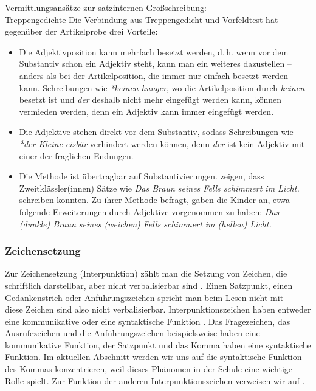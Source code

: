 \begin{Exkurs}{Vermittlungsansätze zur satzinternen Großschreibung:\\ Treppengedichte}
Die Verbindung aus Treppengedicht und Vorfeldtest hat gegenüber der Artikelprobe drei Vorteile:

\begin{itemize}
    \item Die Adjektivposition kann mehrfach besetzt werden, d.\,h.  wenn vor dem Substantiv schon ein Adjektiv steht, kann man ein weiteres dazustellen -- anders als bei der Artikelposition, die immer nur einfach besetzt werden kann. Schreibungen wie \textit{*keinen hunger}, wo die Artikelposition durch \textit{keinen} besetzt ist und \textit{der} deshalb nicht mehr eingefügt werden kann, können vermieden werden, denn ein Adjektiv kann immer eingefügt werden.
    \item Die Adjektive stehen direkt vor dem Substantiv, sodass Schreibungen wie \textit{*der Kleine eisbär} verhindert werden können, denn \textit{der} ist kein Adjektiv mit einer der fraglichen Endungen.
    \item Die Methode ist übertragbar auf Substantivierungen. \citet[19--20]{GuentherNuenke2005} zeigen, dass Zweitklässler(innen) Sätze wie \textit{Das Braun seines Fells schimmert im Licht.} schreiben konnten. Zu ihrer Methode befragt, gaben die Kinder an, etwa folgende Erweiterungen durch Adjektive vorgenommen zu haben: \textit{Das (dunkle) Braun seines (weichen) Fells schimmert im (hellen) Licht.}
    
\end{itemize} 

\end{Exkurs}

\subsubsection{Zeichensetzung}\label{subsec:Zeichensetzung}

Zur Zeichensetzung (Interpunktion) zählt man die Setzung von Zeichen, die schriftlich darstellbar, aber nicht verbalisierbar sind \citep[9]{Bredel2020}. Einen Satzpunkt, einen Gedankenstrich oder Anführungszeichen spricht man beim Lesen nicht mit -- diese Zeichen sind also nicht verbalisierbar. Interpunktionszeichen haben entweder eine kommunikative oder eine syntaktische Funktion \citep[49, 66]{Bredel2020}. Das Fragezeichen, das Ausrufezeichen und die Anführungszeichen beispielsweise haben eine kommunikative Funktion, der Satzpunkt und das Komma haben eine syntaktische Funktion. Im aktuellen Abschnitt werden wir uns auf die syntaktische Funktion des Kommas konzentrieren, weil dieses Phänomen in der Schule eine wichtige Rolle spielt. Zur Funktion der anderen Interpunktionszeichen verweisen wir auf \citet{Bredel2020}. 


